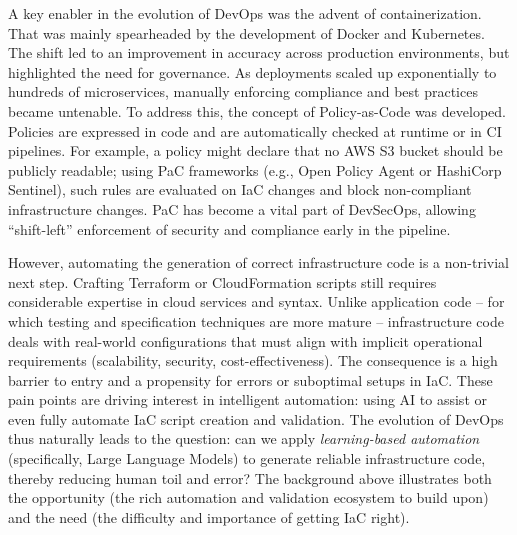 \documentclass[manuscript,screen,nonacm]{acmart}
\begin{document}
A key enabler in the evolution of DevOps was the advent of containerization. That was mainly spearheaded by the development of Docker \cite{merkel2014docker} and Kubernetes. The shift led to an improvement in accuracy across production environments, but highlighted the need for governance. As deployments scaled up exponentially to hundreds of microservices, manually enforcing compliance and best practices became untenable. To address this, the concept of Policy-as-Code \cite{chittala2024securing} was developed. Policies are expressed in code and are automatically checked at runtime or in CI pipelines. For example, a policy might declare that no AWS S3 bucket should be publicly readable; using PaC frameworks (e.g., Open Policy Agent or HashiCorp Sentinel), such rules are evaluated on IaC changes and block non-compliant infrastructure changes. PaC has become a vital part of DevSecOps, allowing “shift-left” enforcement of security and compliance early in the pipeline.

However, automating the generation of correct infrastructure code is a non-trivial next step. Crafting Terraform or CloudFormation scripts still requires considerable expertise in cloud services and syntax. Unlike application code – for which testing and specification techniques are more mature – infrastructure code deals with real-world configurations that must align with implicit operational requirements (scalability, security, cost-effectiveness). The consequence is a high barrier to entry and a propensity for errors or suboptimal setups in IaC. These pain points are driving interest in intelligent automation: using AI to assist or even fully automate IaC script creation and validation. The evolution of DevOps thus naturally leads to the question: can we apply \textit{learning-based automation} (specifically, Large Language Models) to generate reliable infrastructure code, thereby reducing human toil and error? The background above illustrates both the opportunity (the rich automation and validation ecosystem to build upon) and the need (the difficulty and importance of getting IaC right).
\end{document}
